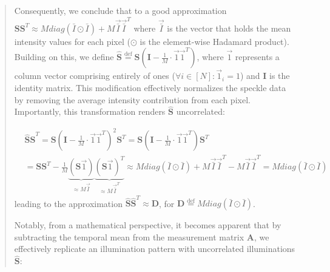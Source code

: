 \documentclass[12pt]{article}
\newenvironment{ourresponse}
    {\begin{tcolorbox}[width=\linewidth,breakable,enhanced,colback=gray!5,colframe=responsecolor!50,title=Response,left=5pt,right=5pt]}
    {\end{tcolorbox}}
\begin{document}
\begin{enumerate}[label=\arabic*.]
\begin{ourresponse}
\begin{quote}
            Consequently, we conclude that to a good approximation $\textbf{S}\textbf{S}^{T} \approx Mdiag(\bar{I}\odot \bar{I}) + M\vec{\bar{I}}\vec{\bar{I}}^T$ where $\vec{\bar{I}}$ is the vector that holds the mean intensity values for each pixel ($\odot$ is the element-wise Hadamard product).
            Building on this, we define $\hat{\textbf{S}}\stackrel{\text{def}} = \textbf{S} (\mathbf{I}-\frac{1}{M}\cdot\vec{1}\vec{1}^T)$, where $\vec{1}$ represents a column vector comprising entirely of ones ($\forall i\in[N] :
            \vec{1}_{i}=1$) and $\mathbf{I}$ is the identity matrix. This modification effectively normalizes the speckle data by removing the average intensity contribution from each pixel.
            Importantly, this transformation renders $\hat{\textbf{S}}$ uncorrelated:
            
            \begin{align}
            &\hat{\textbf{S}} \hat{\textbf{S}}^T = \textbf{S}(\mathbf{I}-\frac{1}{M}\cdot\vec{1}\vec{1}^T)^2\textbf{S}^T = \textbf{S}(\mathbf{I}-\frac{1}{M}\cdot\vec{1}\vec{1}^T)\textbf{S}^T \nonumber &\\ &= \textbf{S}\textbf{S}^T-\frac{1}{M}
            \underbrace{(\textbf{S}\vec{1})}_{\approx M\vec{\bar{I}}}
            \underbrace{(\textbf{S}\vec{1})^T}_{\approx M\vec{\bar{I}}^T}\approx Mdiag(\bar{I}\odot \bar{I}) + M\vec{\bar{I}}\vec{\bar{I}}^T- M\vec{\bar{I}}\vec{\bar{I}}^T = Mdiag(\bar{I}\odot \bar{I}) &
            \label{eq:2}
            \tag{S2}
            \end{align}
            leading to the approximation ${\hat{\textbf{S}}} \hat{\textbf{S}}^T \approx \textbf{D}$, for $\textbf{D}\stackrel{\text{def}} =  Mdiag(\bar{I}\odot \bar{I})$.
            
            
            Notably, from a mathematical perspective, it becomes apparent that by subtracting the temporal mean from the measurement matrix $\textbf{A}$, we effectively replicate an illumination pattern with uncorrelated illuminations $\hat{\textbf{S}}$:
            

\end{quote}
\end{ourresponse}
\end{enumerate}
\end{document}
